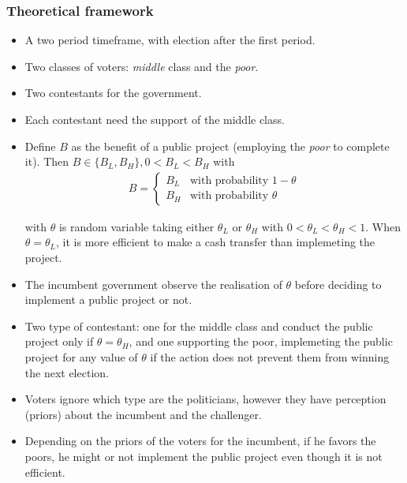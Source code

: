 \subsubsection{Theoretical framework}\label{theoretical-framework}

\begin{itemize}
\item
  A two period timeframe, with election after the first period.
\item
  Two classes of voters: \emph{middle} class and the \emph{poor}.
\item
  Two contestants for the government.
\item
  Each contestant need the support of the middle class.
\item
  Define \(B\) as the benefit of a public project (employing the
  \emph{poor} to complete it). Then
  \(B \in \{B_L, B_H\}, 0 < B_L < B_H\) with\\

  \begin{align*}
  B =
  \left\{
    \begin{array}{ll}
    B_L & \mbox{with probability } 1-\theta \\
    B_H & \mbox{with probability } \theta
    \end{array}
  \right.
  \end{align*}

  with \(\theta\) is random variable taking either \(\theta_L\) or
  \(\theta_H\) with \(0 < \theta_L < \theta_H < 1\). When
  \(\theta=\theta_L\), it is more efficient to make a cash transfer than
  implemeting the project.
\item
  The incumbent government observe the realisation of \(\theta\) before
  deciding to implement a public project or not.
\item
  Two type of contestant: one for the middle class and conduct the
  public project only if \(\theta = \theta_H\), and one supporting the
  poor, implemeting the public project for any value of \(\theta\) if
  the action does not prevent them from winning the next election.
\item
  Voters ignore which type are the politicians, however they have
  perception (priors) about the incumbent and the challenger.
\item
  Depending on the priors of the voters for the incumbent, if he favors
  the poors, he might or not implement the public project even though it
  is not efficient.
\end{itemize}

